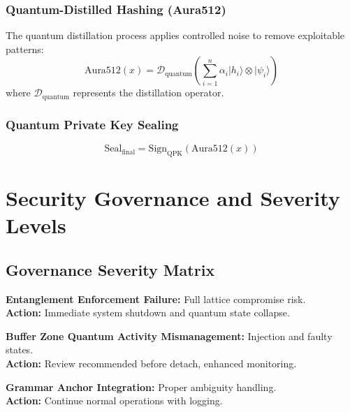 \documentclass[12pt,a4paper]{article}
\begin{document}
\subsubsection{Quantum-Distilled Hashing (Aura512)}
The quantum distillation process applies controlled noise to remove exploitable patterns:
\begin{equation}
\text{Aura512}(x) = \mathcal{D}_{\text{quantum}}\left(\sum_{i=1}^{n} \alpha_i |h_i\rangle \otimes |\psi_i\rangle\right)
\end{equation}
where $\mathcal{D}_{\text{quantum}}$ represents the distillation operator.

\subsubsection{Quantum Private Key Sealing}
\begin{equation}
\text{Seal}_{\text{final}} = \text{Sign}_{\text{QPK}}(\text{Aura512}(x))
\end{equation}

\section{Security Governance and Severity Levels}

\subsection{Governance Severity Matrix}

\begin{tcolorbox}[colback=red!10!white,colframe=red!80!black,title=Critical Severity]
\textbf{Entanglement Enforcement Failure:} Full lattice compromise risk.\\
\textbf{Action:} Immediate system shutdown and quantum state collapse.
\end{tcolorbox}

\begin{tcolorbox}[colback=orangesev!10!white,colframe=orangesev!80!black,title=Warning Severity]
\textbf{Buffer Zone Quantum Activity Mismanagement:} Injection and faulty states.\\
\textbf{Action:} Review recommended before detach, enhanced monitoring.
\end{tcolorbox}

\begin{tcolorbox}[colback=greensev!10!white,colframe=greensev!80!black,title=Safe Practice]
\textbf{Grammar Anchor Integration:} Proper ambiguity handling.\\
\textbf{Action:} Continue normal operations with logging.
\end{tcolorbox}
\end{document}
